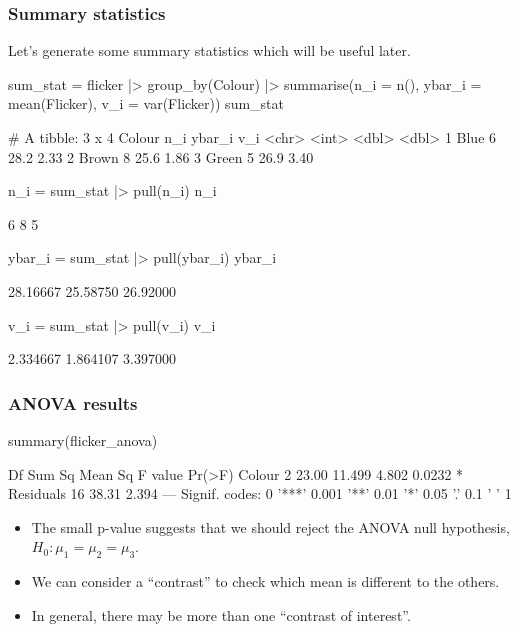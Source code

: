 \documentclass[a4paper]{article}
\begin{document}
\subsubsection{Summary statistics}
Let's generate some summary statistics which will be useful later.
\begin{Schunk}
\begin{Sinput}
sum_stat = flicker |> group_by(Colour) |>
  summarise(n_i = n(),
            ybar_i = mean(Flicker),
            v_i = var(Flicker))
sum_stat
\end{Sinput}
\begin{Soutput}
# A tibble: 3 x 4
  Colour   n_i ybar_i   v_i
  <chr>  <int>  <dbl> <dbl>
1 Blue       6   28.2  2.33
2 Brown      8   25.6  1.86
3 Green      5   26.9  3.40
\end{Soutput}
\begin{Sinput}
n_i = sum_stat |> pull(n_i)
n_i
\end{Sinput}
\begin{Soutput}
[1] 6 8 5
\end{Soutput}
\begin{Sinput}
ybar_i = sum_stat |> pull(ybar_i)
ybar_i
\end{Sinput}
\begin{Soutput}
[1] 28.16667 25.58750 26.92000
\end{Soutput}
\begin{Sinput}
v_i = sum_stat |> pull(v_i)
v_i
\end{Sinput}
\begin{Soutput}
[1] 2.334667 1.864107 3.397000
\end{Soutput}
\end{Schunk}
\subsubsection{ANOVA results}
\begin{Schunk}
\begin{Sinput}
summary(flicker_anova)
\end{Sinput}
\begin{Soutput}
            Df Sum Sq Mean Sq F value Pr(>F)  
Colour       2  23.00  11.499   4.802 0.0232 *
Residuals   16  38.31   2.394                 
---
Signif. codes:  0 '***' 0.001 '**' 0.01 '*' 0.05 '.' 0.1 ' ' 1
\end{Soutput}
\end{Schunk}
\begin{itemize}
	\item The small p-value suggests that we should reject the ANOVA null hypothesis, \( H_0: \mu_1 = \mu_2 = \mu_3 \).
	\item We can consider a ``contrast'' to check which mean is different to the others.
	\item In general, there may be more than one ``contrast of interest''.
\end{itemize}
\end{document}
